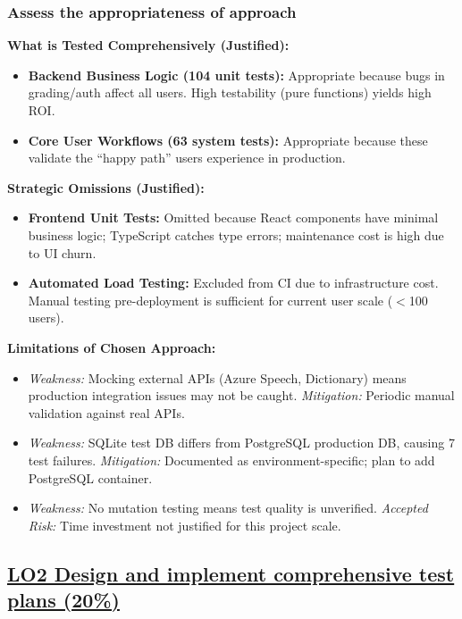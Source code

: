 \documentclass[sigconf]{acmart}
\begin{document}
\subsubsection{Assess the appropriateness of approach}

\textbf{What is Tested Comprehensively (Justified):}
\begin{itemize}[noitemsep]
    \item \textbf{Backend Business Logic (104 unit tests):} Appropriate because bugs in grading/auth affect all users. High testability (pure functions) yields high ROI.
    \item \textbf{Core User Workflows (63 system tests):} Appropriate because these validate the ``happy path'' users experience in production.
\end{itemize}

\textbf{Strategic Omissions (Justified):}
\begin{itemize}[noitemsep]
    \item \textbf{Frontend Unit Tests:} Omitted because React components have minimal business logic; TypeScript catches type errors; maintenance cost is high due to UI churn.
    \item \textbf{Automated Load Testing:} Excluded from CI due to infrastructure cost. Manual testing pre-deployment is sufficient for current user scale ($<$100 users).
\end{itemize}

\textbf{Limitations of Chosen Approach:}
\begin{itemize}[noitemsep]
    \item \textit{Weakness:} Mocking external APIs (Azure Speech, Dictionary) means production integration issues may not be caught. \textit{Mitigation:} Periodic manual validation against real APIs.
    \item \textit{Weakness:} SQLite test DB differs from PostgreSQL production DB, causing 7 test failures. \textit{Mitigation:} Documented as environment-specific; plan to add PostgreSQL container.
    \item \textit{Weakness:} No mutation testing means test quality is unverified. \textit{Accepted Risk:} Time investment not justified for this project scale.
\end{itemize}

\subsection{\href{https://github.com/JoshAn0107/speakright.uk/blob/main/LO2_COMPLETE.md}{LO2 Design and implement comprehensive test plans (20\%)}}
\end{document}
